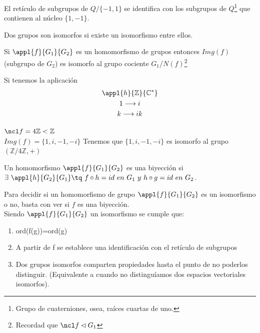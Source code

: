 \documentclass[nochap]{apuntes}
\begin{document}
\begin{example}
El retículo de subgrupos de $Q/{\{ -1, 1 \} }$ se identifica con los subgrupos de $Q$\footnote{Grupo de cuaterniones, osea, raíces cuartas de uno.} que contienen al núcleo $\{ 1, -1\} $.
\end{example}

\begin{defn}
Dos grupos son isomorfos si existe un isomorfismo entre ellos.
\end{defn}

\begin{theorem}\label{thmIsomorfia1}
Si $\appl{f}{G_1}{G_2}$ es un homomorfismo de grupos entonces $Img(f)$ (subgrupo de $G_2$) es isomorfo al grupo cociente $G_1/{N(f)}$\footnote{Recordad que $\ncl f \lhd G_1$}
\end{theorem}

\begin{example}
Si tenemos la aplicación 
\begin{gather*}
\appl{h}{\mathbb{Z}}{\mathbb{C}^*}\\
1 \longrightarrow i\\
k\longrightarrow ik\\
\end{gather*}

$\ncl f = 4\mathbb{Z} < \mathbb{Z}$\\
$Img(f) = \{1, i, -1, -i \}$
Tenemos que $\{ 1, i, -1, -i \}$ es isomorfo al grupo $(\mathbb{Z} /4\mathbb{Z}, +)$
\end{example}

\begin{defn}[Biyección]
 Un homomorfismo $\appl{f}{G_1}{G_2}$ es una biyección si \\
 $\exists \ \appl{h}{G_2}{G_1} \tq \ f\circ h =id \ en \ G_1 \ y\ h \circ g = id \ en \ G_2$.
\end{defn}
Para decidir si un homomorfismo de grupo $\appl{f}{G_1}{G_2}$  es un isomorfismo o no, basta con ver si $f$  es una biyección.\\

Siendo $\appl{f}{G_1}{G_2}$ un isomorfismo se cumple que:
\begin{enumerate}
 \item ord(f(g))=ord(g)
 \item A partir de f se establece una identificación con el retículo de subgrupos
 \item Dos grupos isomorfos comparten propiedades hasta el punto de no poderlos distinguir. (Equivalente a cuando no distinguíamos
 dos espacios vectoriales isomorfos).
\end{enumerate}
\end{document}
